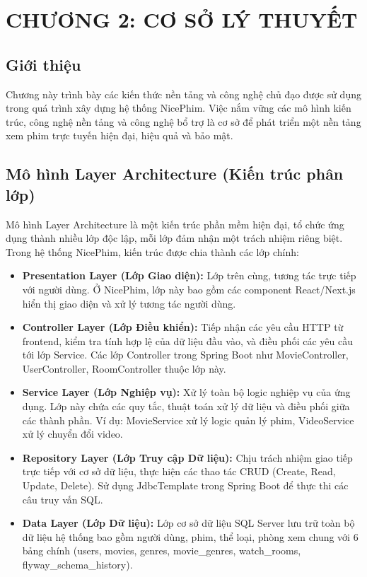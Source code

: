 \newpage

\section{CHƯƠNG 2: CƠ SỞ LÝ THUYẾT  }



\subsection{Giới thiệu}

Chương này trình bày các kiến thức nền tảng và công nghệ chủ đạo được sử dụng trong quá trình xây dựng hệ thống NicePhim. Việc nắm vững các mô hình kiến trúc, công nghệ nền tảng và công nghệ bổ trợ là cơ sở để phát triển một nền tảng xem phim trực tuyến hiện đại, hiệu quả và bảo mật.

\subsection{Mô hình Layer Architecture (Kiến trúc phân lớp)}

Mô hình Layer Architecture là một kiến trúc phần mềm hiện đại, tổ chức ứng dụng thành nhiều lớp độc lập, mỗi lớp đảm nhận một trách nhiệm riêng biệt. Trong hệ thống NicePhim, kiến trúc được chia thành các lớp chính:

\begin{itemize}
	\item \textbf{Presentation Layer (Lớp Giao diện):} Lớp trên cùng, tương tác trực tiếp với người dùng. Ở NicePhim, lớp này bao gồm các component React/Next.js hiển thị giao diện và xử lý tương tác người dùng.

	\item \textbf{Controller Layer (Lớp Điều khiển):} Tiếp nhận các yêu cầu HTTP từ frontend, kiểm tra tính hợp lệ của dữ liệu đầu vào, và điều phối các yêu cầu tới lớp Service. Các lớp Controller trong Spring Boot như MovieController, UserController, RoomController thuộc lớp này.

	\item \textbf{Service Layer (Lớp Nghiệp vụ):} Xử lý toàn bộ logic nghiệp vụ của ứng dụng. Lớp này chứa các quy tắc, thuật toán xử lý dữ liệu và điều phối giữa các thành phần. Ví dụ: MovieService xử lý logic quản lý phim, VideoService xử lý chuyển đổi video.

	\item \textbf{Repository Layer (Lớp Truy cập Dữ liệu):} Chịu trách nhiệm giao tiếp trực tiếp với cơ sở dữ liệu, thực hiện các thao tác CRUD (Create, Read, Update, Delete). Sử dụng JdbcTemplate trong Spring Boot để thực thi các câu truy vấn SQL.

	\item \textbf{Data Layer (Lớp Dữ liệu):} Lớp cơ sở dữ liệu SQL Server lưu trữ toàn bộ dữ liệu hệ thống bao gồm người dùng, phim, thể loại, phòng xem chung với 6 bảng chính (users, movies, genres, movie\_genres, watch\_rooms, flyway\_schema\_history).
\end{itemize}

